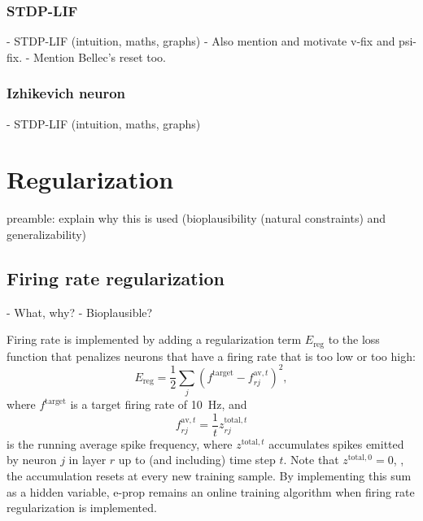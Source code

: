 		\subsubsection{STDP-LIF}
			\begin{tcolorbox}[colback=orange]

			- STDP-LIF (intuition, maths, graphs)
			- Also mention and motivate v-fix and psi-fix.
			- Mention Bellec's reset too.

			\end{tcolorbox}
		\subsubsection{Izhikevich neuron}
			\begin{tcolorbox}[colback=orange]

			- STDP-LIF (intuition, maths, graphs)

			\end{tcolorbox}

\section{Regularization}

	\begin{tcolorbox}[colback=orange]
	preamble: explain why this is used (bioplausibility (natural constraints) and generalizability)

	\end{tcolorbox}

	\subsection{Firing rate regularization}
		\begin{tcolorbox}[colback=orange]
		- What, why?
		- Bioplausible?

		\end{tcolorbox}
		Firing rate is implemented by adding a regularization term $E_\text{reg}$ to the loss function that penalizes neurons that have a firing rate that is too low or too high:
		\begin{equation}
			E_\text{reg} = \frac{1}{2}\sum_j\left(f^\text{target} - f^{\text{av}, t}_{rj}\right)^2,
		\end{equation}
		where $f^\text{target}$ is a target firing rate of \SI{10}{\Hz}, and
		\begin{equation}
		f^{\text{av},t}_{rj} = \frac{1}{t} z^{\text{total},t}_{rj}
		\end{equation}
		is the running average spike frequency, where $z^{\text{total},t}$ accumulates spikes emitted by neuron $j$ in layer $r$ up to (and including) time step $t$.
		Note that $z^{\text{total},0} = 0$, \ie, the accumulation resets at every new training sample.
		By implementing this sum as a hidden variable, e-prop remains an online training algorithm when firing rate regularization is implemented.

